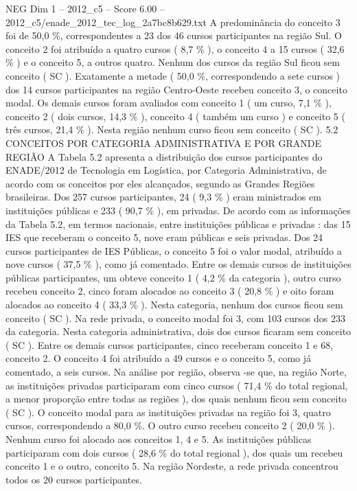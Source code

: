 \begin{textsample}{NEG Dim 1 – 2012\_c5 – Score 6.00 – 2012\_c5/enade\_2012\_tec\_log\_2a7bc8b629.txt}
A predominância do conceito 3 foi de 50,0 \%, correspondentes a 23 dos 46 cursos participantes na região Sul.
O conceito 2 foi atribuído a quatro cursos ( 8,7 \% ), o conceito 4 a 15 cursos ( 32,6 \% ) e o conceito 5, a outros quatro.
Nenhum dos cursos da região Sul ficou sem conceito ( SC ).
Exatamente a metade ( 50,0 \%, correspondendo a sete cursos ) dos 14 cursos participantes na região Centro-Oeste recebeu conceito 3, o conceito modal.
Os demais cursos foram avaliados com conceito 1 ( um curso, 7,1 \% ), conceito 2 ( dois cursos, 14,3 \% ), conceito 4 ( também um curso ) e conceito 5 ( três cursos, 21,4 \% ).
Nesta região nenhum curso ficou sem conceito ( SC ). 5.2 CONCEITOS POR CATEGORIA ADMINISTRATIVA E POR GRANDE REGIÃO A Tabela 5.2 apresenta a distribuição dos cursos participantes do ENADE/2012 de Tecnologia em Logística, por Categoria Administrativa, de acordo com os conceitos por eles alcançados, segundo as Grandes Regiões brasileiras.
Dos 257 cursos participantes, 24 ( 9,3 \% ) eram ministrados em instituições públicas e 233 ( 90,7 \% ), em privadas.
De acordo com as informações da Tabela 5.2, em termos nacionais, entre instituições públicas e privadas : das 15 IES que receberam o conceito 5, nove eram públicas e seis privadas.
Dos 24 cursos participantes de IES Públicas, o conceito 5 foi o valor modal, atribuído a nove cursos ( 37,5 \% ), como já comentado.
Entre os demais cursos de instituições públicas participantes, um obteve conceito 1 ( 4,2 \% da categoria ), outro curso recebeu conceito 2, cinco foram alocados ao conceito 3 ( 20,8 \% ) e oito foram alocados ao conceito 4 ( 33,3 \% ).
Nesta categoria, nenhum dos cursos ficou sem conceito ( SC ).
Na rede privada, o conceito modal foi 3, com 103 cursos dos 233 da categoria.
Nesta categoria administrativa, dois dos cursos ficaram sem conceito ( SC ).
Entre os demais cursos participantes, cinco receberam conceito 1 e 68, conceito 2.
O conceito 4 foi atribuído a 49 cursos e o conceito 5, como já comentado, a seis cursos.
Na análise por região, observa -se que, na região Norte, as instituições privadas participaram com cinco cursos ( 71,4 \% do total regional, a menor proporção entre todas as regiões ), dos quais nenhum ficou sem conceito ( SC ).
O conceito modal para as instituições privadas na região foi 3, quatro cursos, correspondendo a 80,0 \%.
O outro curso recebeu conceito 2 ( 20,0 \% ).
Nenhum curso foi alocado aos conceitos 1, 4 e 5.
As instituições públicas participaram com dois cursos ( 28,6 \% do total regional ), dos quais um recebeu conceito 1 e o outro, conceito 5.
Na região Nordeste, a rede privada concentrou todos os 20 cursos participantes.

\end{textsample}
